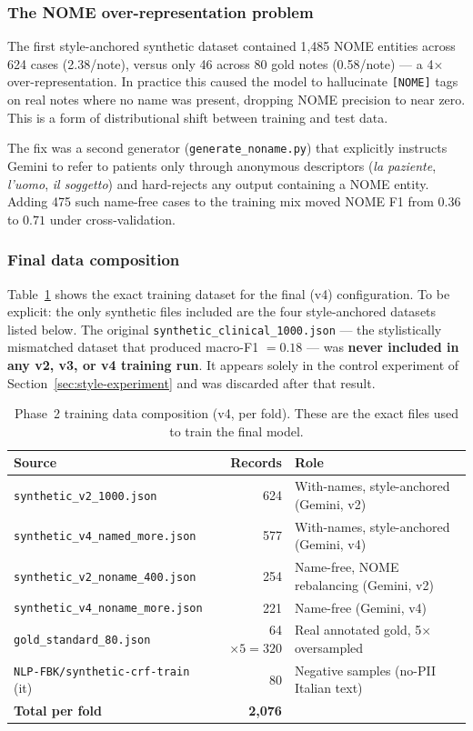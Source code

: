 \documentclass[11pt,a4paper]{article}
\begin{document}
\subsubsection{The NOME over-representation problem}
\label{sec:nome-problem}

The first style-anchored synthetic dataset contained 1{,}485 NOME entities across 624 cases (2.38/note), versus only 46 across 80 gold notes (0.58/note) — a 4$\times$ over-representation. In practice this caused the model to hallucinate \texttt{[NOME]} tags on real notes where no name was present, dropping NOME precision to near zero. This is a form of distributional shift between training and test data.

The fix was a second generator (\texttt{generate\_noname.py}) that explicitly instructs Gemini to refer to patients only through anonymous descriptors (\textit{la paziente}, \textit{l'uomo}, \textit{il soggetto}) and hard-rejects any output containing a NOME entity. Adding 475 such name-free cases to the training mix moved NOME F1 from $0.36$ to $0.71$ under cross-validation.

\subsubsection{Final data composition}

Table~\ref{tab:data-sources} shows the exact training dataset for the final (v4) configuration. To be explicit: the only synthetic files included are the four style-anchored datasets listed below. The original \texttt{synthetic\_clinical\_1000.json} — the stylistically mismatched dataset that produced macro-F1 $= 0.18$ — was \textbf{never included in any v2, v3, or v4 training run}. It appears solely in the control experiment of Section~\ref{sec:style-experiment} and was discarded after that result.

\begin{table}[h]
\centering
\caption{Phase~2 training data composition (v4, per fold). These are the exact files used to train the final model.}
\label{tab:data-sources}
\begin{tabular}{lrl}
\toprule
Source & Records & Role \\
\midrule
\texttt{synthetic\_v2\_1000.json}      & 624  & With-names, style-anchored (Gemini, v2) \\
\texttt{synthetic\_v4\_named\_more.json}  & 577  & With-names, style-anchored (Gemini, v4) \\
\texttt{synthetic\_v2\_noname\_400.json}  & 254  & Name-free, NOME rebalancing (Gemini, v2) \\
\texttt{synthetic\_v4\_noname\_more.json} & 221  & Name-free (Gemini, v4) \\
\texttt{gold\_standard\_80.json}       & 64 $\times 5 = 320$ & Real annotated gold, 5$\times$ oversampled \\
\texttt{NLP-FBK/synthetic-crf-train} (it) & 80 & Negative samples (no-PII Italian text) \\
\midrule
\textbf{Total per fold}  & \textbf{2{,}076} & \\
\bottomrule
\end{tabular}
\end{table}
\end{document}
